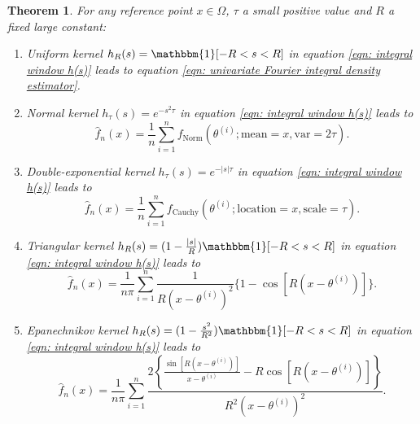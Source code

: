 \documentclass[%
 reprint,
 amsmath,amssymb,
 aps,
]{revtex4-2}
\newtheorem{theorem}{Theorem}[section]
\begin{document}
\begin{theorem} \label{theorem: FI integral windows}
For any reference point $x \in \Omega$, $\tau$ a small positive value and $R$ a fixed large constant:
    \begin{enumerate}
        \item Uniform kernel $h_R(s) = \mathbbm{1}[-R < s < R]$ in equation \eqref{eqn: integral window h(s)} leads to equation \eqref{eqn: univariate Fourier integral density estimator}.
        \item Normal kernel $h_\tau(s) = e^{-s^2\tau}$ in equation \eqref{eqn: integral window h(s)} leads to
        \begin{equation} \label{eqn: normal window FI}
            \hat{f}_n(x) = \frac{1}{n} \sum_{i = 1}^n f_\text{Norm}(\theta^{(i)}; \text{mean} = x, \text{var} = 2\tau).
        \end{equation}
        \item Double-exponential kernel $h_\tau(s) = e^{-|s|\tau}$ in equation \eqref{eqn: integral window h(s)} leads to \begin{equation} \label{eqn: Cauchy window FI}
            \hat{f}_n(x) = \frac{1}{n} \sum_{i = 1}^n f_\text{Cauchy}(\theta^{(i)}; \text{location} = x, \text{scale} = \tau).
        \end{equation}
        \item Triangular kernel $h_R(s) = (1 - \frac{|s|}{R}) \mathbbm{1}[-R < s < R]$ in equation \eqref{eqn: integral window h(s)} leads to
        \begin{equation} \label{eqn: triangular kernel window FI}
            \hat{f}_n(x) = \frac{1}{n\pi} \sum_{i = 1}^n \frac{1}{R(x - \theta^{(i)})^2}\{1 - \cos[R(x - \theta^{(i)})]\}.
        \end{equation}
        \item Epanechnikov kernel $h_R(s) = (1 - \frac{s^2}{R^2}) \mathbbm{1}[-R < s < R]$ in equation \eqref{eqn: integral window h(s)} leads to
        \begin{equation} \label{eqn: Epanechnikov kernel window FI}
            \hat{f}_n(x) = \frac{1}{n\pi} \sum_{i = 1}^n \frac{2\left\{\frac{\sin[R(x - \theta^{(i)})]}{x - \theta^{(i)}} - R\cos[R(x - \theta^{(i)})] \right\}}{R^2(x - \theta^{(i)})^2}.
        \end{equation}
    \end{enumerate}
\end{theorem}
\end{document}
